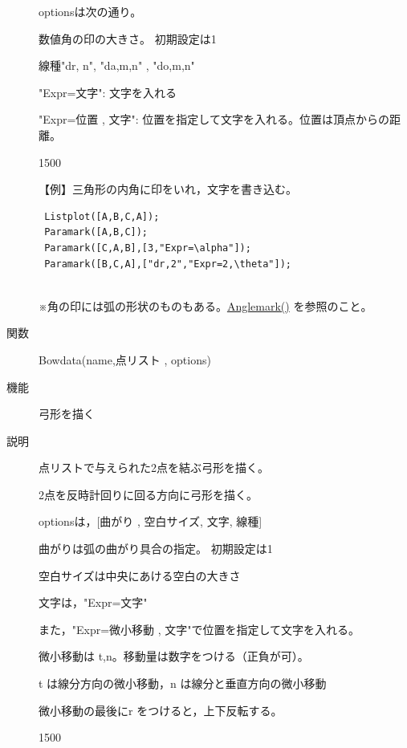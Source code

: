 \documentclass[papersize,a4paper,10pt,uplatex]{jsarticle}
\begin{document}
\begin{description}
optionsは次の通り。

数値角の印の大きさ。 初期設定は1

線種"dr, n", "da,m,n" , "do,m,n"

"Expr=文字": 文字を入れる

"Expr=位置 , 文字": 位置を指定して文字を入れる。位置は頂点からの距離。

\vspace{\baselineskip}
\begin{layer}{150}{0}
\end{layer}

【例】三角形の内角に印をいれ，文字を書き込む。

\begin{verbatim}
 Listplot([A,B,C,A]);
 Paramark([A,B,C]);
 Paramark([C,A,B],[3,"Expr=\alpha"]);
 Paramark([B,C,A],["dr,2","Expr=2,\theta"]);
 
\end{verbatim}

※角の印には弧の形状のものもある。\hyperlink{anglemark}{Anglemark()} を参照のこと。\\

\vspace{\baselineskip}
\hypertarget{bowdata}{}
\item[関数]Bowdata(name,点リスト , options)
\item[機能]弓形を描く
\item[説明]点リストで与えられた2点を結ぶ弓形を描く。

2点を反時計回りに回る方向に弓形を描く。

optionsは，[曲がり , 空白サイズ, 文字, 線種]

曲がりは弧の曲がり具合の指定。 初期設定は1

空白サイズは中央にあける空白の大きさ

文字は，"Expr=文字" 

また，"Expr=微小移動 , 文字"で位置を指定して文字を入れる。

微小移動は t,n。移動量は数字をつける（正負が可）。

 t は線分方向の微小移動，n は線分と垂直方向の微小移動

 微小移動の最後にr をつけると，上下反転する。

\vspace{\baselineskip}
 \begin{layer}{150}{0}
 \end{layer}


\end{description}
\end{document}
